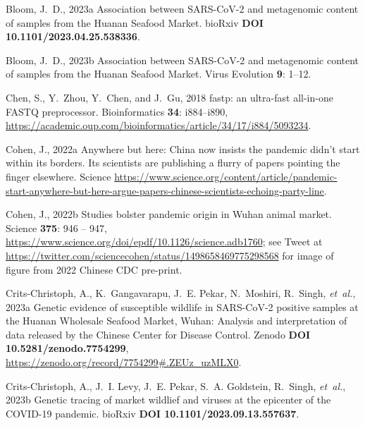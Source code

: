 \documentclass[9pt,onecolumn,twoside]{gsajnl_modified}
\begin{document}
{\begin{thebibliography}{17}

{Bloom, J.~D.}, 2023{a} Association between {SARS-CoV-2} and metagenomic
  content of samples from the {Huanan Seafood Market}. bioRxiv {\bf DOI
  10.1101/2023.04.25.538336}.

{Bloom, J.~D.}, 2023{b} Association between {SARS-CoV-2} and metagenomic
  content of samples from the {Huanan Seafood Market}. Virus Evolution {\bf 9}:
  1--12.

{Chen, S., Y.~Zhou, Y.~Chen, {\rm and} J.~Gu}, 2018 fastp: an ultra-fast
  all-in-one {FASTQ} preprocessor. Bioinformatics {\bf 34}: i884--i890,
  \url{https://academic.oup.com/bioinformatics/article/34/17/i884/5093234}.

{Cohen, J.}, 2022{a} {Anywhere but here: China now insists the pandemic
  didn’t start within its borders. Its scientists are publishing a flurry of
  papers pointing the finger elsewhere}. Science
  \url{https://www.science.org/content/article/pandemic-start-anywhere-but-here-argue-papers-chinese-scientists-echoing-party-line}.

{Cohen, J.}, 2022{b} Studies bolster pandemic origin in {W}uhan animal market.
  Science {\bf 375}: 946 -- 947,
  \url{https://www.science.org/doi/epdf/10.1126/science.adb1760}; see Tweet at
  \url{https://twitter.com/sciencecohen/status/1498658469775298568} for image
  of figure from 2022 Chinese CDC pre-print.

{Crits-Christoph, A., K.~Gangavarapu, J.~E. Pekar, N.~Moshiri, R.~Singh, {\em
  et~al.\/}}, 2023{a} {Genetic evidence of susceptible wildlife in SARS-CoV-2
  positive samples at the Huanan Wholesale Seafood Market, Wuhan: Analysis and
  interpretation of data released by the Chinese Center for Disease Control}.
  Zenodo {\bf DOI 10.5281/zenodo.7754299},
  \url{https://zenodo.org/record/7754299#.ZEUz_uzMLX0}.

{Crits-Christoph, A., J.~I. Levy, J.~E. Pekar, S.~A. Goldstein, R.~Singh, {\em
  et~al.\/}}, 2023{b} Genetic tracing of market wildlief and viruses at the
  epicenter of the {COVID-19} pandemic. bioRxiv {\bf DOI
  10.1101/2023.09.13.557637}.


\end{thebibliography}}
\end{document}
